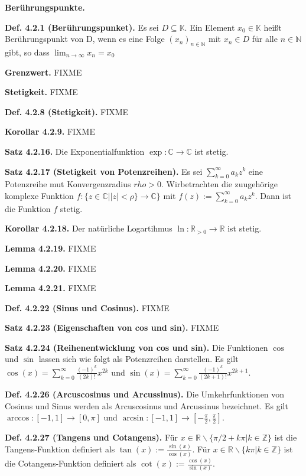 \textbf{Berührungspunkte.}

\textbf{Def. 4.2.1 (Berührungspunket).} Es sei $D \subseteq \mathbb K$. Ein Element $x_0 \in \mathbb K$ heißt Berührungspunkt von D, wenn es eine Folge $(x_n)_{n \in \mathbb N}$ mit $x_n \in D$ für alle $n \in \mathbb N$ gibt, so dass $\lim_{n \rightarrow \infty} x_n = x_0$

\textbf{Grenzwert.} FIXME

\textbf{Stetigkeit.} FIXME

\textbf{Def. 4.2.8 (Stetigkeit).} FIXME

\textbf{Korollar 4.2.9.} FIXME

\textbf{Satz 4.2.16.} Die Exponentialfunktion $\exp :\mathbb C \rightarrow \mathbb C$ ist stetig.

\textbf{Satz 4.2.17 (Stetigkeit von Potenzreihen).} Es sei $\sum_{k=0}^\infty a_k z^k$ eine Potenzreihe mut Konvergenzradius $rho > 0$. Wirbetrachten die zuugehörige komplexe Funktion $f : \{ z \in \mathbb C \vert \vert z \vert < \rho \} \rightarrow \mathbb C\}$ mit $f(z) := \sum_{k=0}^\infty a_k z^k$. Dann ist die Funktion $f$ stetig.

\textbf{Korollar 4.2.18.} Der natürliche Logartihmus $\ln : \mathbb R_{>0} \rightarrow \mathbb R$ ist stetig.

\textbf{Lemma 4.2.19.} FIXME

\textbf{Lemma 4.2.20.} FIXME

\textbf{Lemma 4.2.21.} FIXME

\textbf{Def. 4.2.22 (Sinus und Cosinus).} FIXME

\textbf{Satz 4.2.23 (Eigenschaften von cos und sin).} FIXME

\textbf{Satz 4.2.24 (Reihenentwicklung von cos und sin).} Die Funktionen $\cos$ und $\sin$ lassen sich wie folgt als Potenzreihen darstellen. Es gilt $\cos (x) = \sum_{k=0}^\infty \frac{(-1)^k}{(2k)!}x^{2k}$ und $\sin (x) = \sum_{k=0}^\infty \frac{(-1)^k}{(2k+1)!}x^{2k+1}$.

\textbf{Def. 4.2.26 (Arcuscosinus und Arcussinus).} Die Umkehrfunktionen von Cosinus und Sinus werden als Arcuscosinus und Arcussinus bezeichnet. Es gilt $\arccos\colon[-1,1]\to[0,\pi]$ und $\arcsin\colon[-1,1]\to \left[-\frac{\pi}{2},\frac{\pi}{2} \right]$.  

\textbf{Def. 4.2.27 (Tangens und Cotangens).} Für $x\in \mathbb R \backslash \{ \pi /2 + k \pi \vert k \in \mathbb Z \}$ ist die Tangens-Funktion definiert als $\tan(x) := \frac{\sin(x)}{\cos(x)}$. Für $x \in \mathbb R \backslash \{ k\pi \vert k \in \mathbb Z \}$ ist die Cotangens-Funktion definiert als $\cot(x) := \frac{\cos(x)}{\sin(x)}$.

